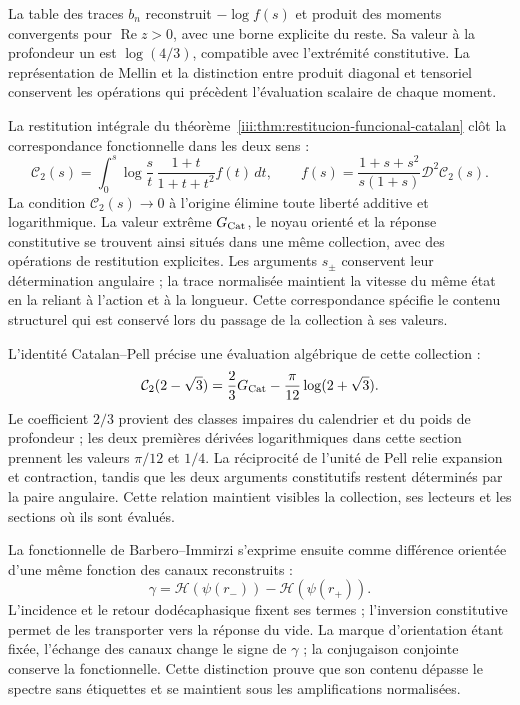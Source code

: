 La table des traces $b_n$ reconstruit $-\log f(s)$ et produit des moments
convergents pour $\operatorname{Re}z>0$, avec une borne explicite du
reste. Sa valeur à la profondeur un est $\log(4/3)$, compatible avec
l’extrémité constitutive. La représentation de Mellin et la distinction
entre produit diagonal et tensoriel conservent les opérations qui
précèdent l’évaluation scalaire de chaque moment.

La restitution intégrale du
théorème~\ref{iii:thm:restitucion-funcional-catalan} clôt la
correspondance fonctionnelle dans les deux sens :
\[
 \mathcal C_2(s)=\int_0^s\log\frac{s}{t}\,
       \frac{1+t}{1+t+t^2}f(t)\,dt,\qquad
 f(s)=\frac{1+s+s^2}{s(1+s)}\mathcal D^2\mathcal C_2(s).
\]
La condition $\mathcal C_2(s)\to0$ à l’origine élimine toute
liberté additive et logarithmique. La valeur extrême $G_{\rm Cat}$,
le noyau orienté et la réponse constitutive se trouvent ainsi situés
dans une même collection, avec des opérations de restitution explicites.
Les arguments $s_\pm$ conservent leur détermination angulaire ; la trace
normalisée maintient la vitesse du même état en la reliant
à l’action et à la longueur. Cette correspondance spécifie le
contenu structurel qui est conservé lors du passage de la collection à ses valeurs.

L’identité Catalan--Pell précise une évaluation algébrique de cette
collection :
\[
\mathcal C_2(2-\sqrt3)
=\frac23G_{\rm Cat}-\frac{\pi}{12}\log(2+\sqrt3).
\]
Le coefficient $2/3$ provient des classes impaires du calendrier et
du poids de profondeur ; les deux premières dérivées logarithmiques dans cette section prennent les valeurs
$\pi/12$ et $1/4$. La réciprocité de l’unité de Pell relie
expansion et contraction, tandis que les deux arguments constitutifs
restent déterminés par la paire angulaire. Cette relation maintient
visibles la collection, ses lecteurs et les sections où ils sont évalués.

La fonctionnelle de Barbero--Immirzi s’exprime ensuite comme différence
orientée d’une même fonction des canaux reconstruits :
\[
\gamma=\mathcal H(\psi(r_-))-\mathcal H(\psi(r_+)).
\]
L’incidence et le retour dodécaphasique fixent ses termes ;
l’inversion constitutive permet de les transporter vers la réponse du
vide. La marque d’orientation étant fixée, l’échange des canaux
change le signe de $\gamma$ ; la conjugaison conjointe conserve la
fonctionnelle. Cette distinction prouve que son contenu dépasse le spectre
sans étiquettes et se maintient sous les amplifications normalisées.

